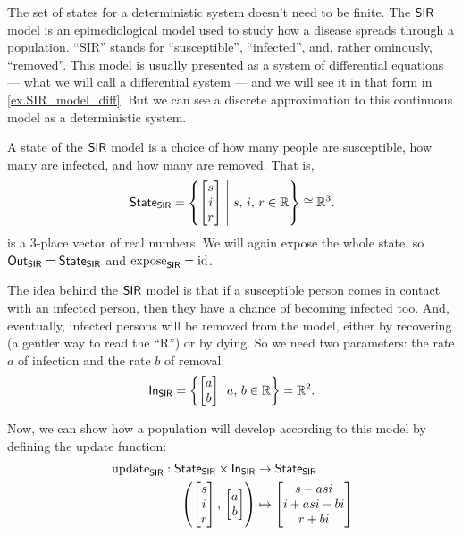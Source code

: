 \documentclass[DynamicalBook]{subfiles}
\begin{document}
\begin{example}\label{ex.SIR_model_discrete}
  The set of states for a deterministic system doesn't need to be finite. The $\mathsf{SIR}$ model
  is an epimediological model used to study how a disease spreads through a
  population. ``SIR'' stands for ``susceptible'', ``infected'', and, rather
  ominously, ``removed''. This model is usually presented as a system of
  differential equations --- what we will call a differential system --- and we will see it in that form in \cref{ex.SIR_model_diff}.
  But we can see a discrete approximation to this continuous model as a
  deterministic system.

  A state of the $\mathsf{SIR}$ model is a choice of how many people are susceptible, how
  many are infected, and how many are removed. That is,
  $$\mathsf{State}_{\mathsf{SIR}} = \left\{\begin{bmatrix} s \\ i \\ r \end{bmatrix}\; \middle|\; s,\, i,\, r\in \mathbb{R}\right\} \cong \mathbb{R}^3.$$
  is a 3-place vector of real numbers. We will again expose the whole state, so
  $\mathsf{Out}_{\mathsf{SIR}} = \mathsf{State}_{\mathsf{SIR}}$ and $\mathrm{expose}_{\mathsf{SIR}} = \mathrm{id}$.

  The idea behind the $\mathsf{SIR}$ model is that if a susceptible person comes in
  contact with an infected person, then they have a chance of becoming infected
  too. And, eventually, infected persons will be removed from the model, either
  by recovering (a gentler way to read the ``R'') or by dying. So we need two
  parameters: the rate $a$ of infection and the rate $b$ of removal:
  $$\mathsf{In}_{\mathsf{SIR}} = \left\{\begin{bmatrix} a \\ b \end{bmatrix}\, \middle|\, a,\, b \in \mathbb{R}\right\} = \mathbb{R}^2.$$

  Now, we can show how a population will develop according to this model by
  defining the update function:
  \begin{align}\label{eqn.SIR_model_discrete}
    \mathrm{update}_{\mathsf{SIR}} : \mathsf{State}_{\mathsf{SIR}} \times \mathsf{In}_{\mathsf{SIR}} &\to \mathsf{State}_{\mathsf{SIR}}\\
    \left( \begin{bmatrix} s\\ i\\ r\\ \end{bmatrix},\, \begin{bmatrix}a \\ b \end{bmatrix} \right) &\mapsto \begin{bmatrix}s - a s i \\ i + a s i - b  i \\ r + b i \end{bmatrix}
  \end{align}

\end{example}
\end{document}
